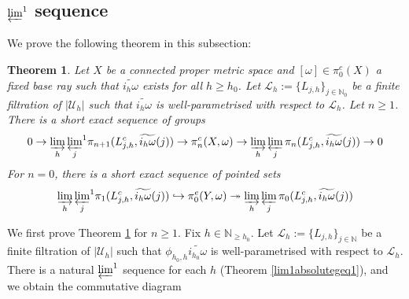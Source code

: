 \documentclass[a4paper,11pt]{article}
\theoremstyle{definition}
\theoremstyle{plain}
\newtheorem{theorem}[definition]{Theorem}
\theoremstyle{remark}
\begin{document}
{\subsection{$\varprojlim^1$ sequence}

We prove the following theorem in this subsection:

\begin{theorem} \label{mainthm}Let $X$ be a connected proper metric space and $[\omega]\in \pi_{0}^{c}(X)$ a fixed base ray such that $\widetilde{i_{h}\omega}$ exists for all $h\geq h_0$.  Let $\mathcal{L}_{h}:=\{L_{j,h}\}_{j\in \mathbb{N}_{0}}$ be a finite filtration of $|\mathcal{U}_{h}|$ such that $\widetilde{i_{h}\omega}$ is well-parametrised with respect to $\mathcal{L}_{h}$. Let $n\geq 1$. There is a short exact sequence of groups
 \begin{align*}
0\rightarrow  \varinjlim_{h} {\varprojlim_{j}}^{1} \pi_{n+1}(L_{j,h}^c,\widetilde{i_{h}\omega}(j))  \rightarrow  \pi_{n}^c(X,\omega) \rightarrow  \varinjlim_{h} \varprojlim_{j} \pi_{n}(L_{j,h}^c,\widetilde{i_{h}\omega}(j)) \rightarrow 0
\end{align*}
For $n=0$, there is a short exact sequence of pointed sets
\begin{align*}
\varinjlim_{h} {\varprojlim_{j}}^{1} \pi_{1}(L_{j,h}^c,\widetilde{i_{h}\omega}(j))  \hookrightarrow \pi^{e}_{0}(Y,\omega) \twoheadrightarrow  \varinjlim_{h} \varprojlim_{j} \pi_{0}(L_{j,h}^c,\widetilde{i_{h}\omega}(j))
\end{align*}
\end{theorem}

We first prove Theorem \ref{mainthm} for $n\geq 1$.  Fix $h\in \mathbb{N}_{\geq h_0}$. Let $\mathcal{L}_{h}:=\{L_{j,h}\}_{j\in \mathbb{N}}$ be a finite filtration of $|\mathcal{U}_{h}|$ such that $\phi_{h_0,h}\widetilde{i_{h_0}\omega}$ is well-parametrised with respect to $\mathcal{L}_{h}$. There is a natural $\varprojlim^{1}$ sequence for each $h$ (Theorem \ref{lim1absolutegeq1}), and we obtain the commutative diagram


}
\end{document}

